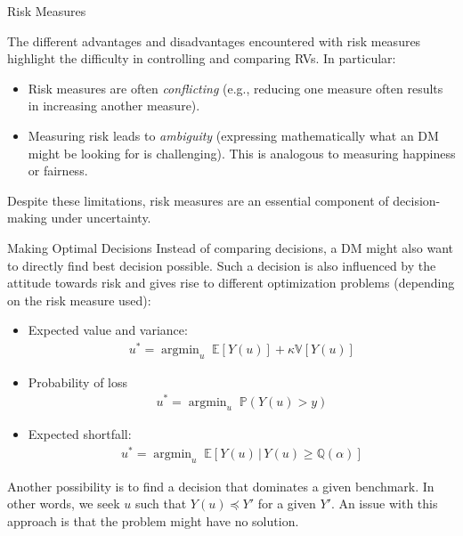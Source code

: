 \documentclass[9pt]{beamer}
\begin{document}
%
\begin{frame}{Risk Measures}

The different advantages and disadvantages encountered with risk measures highlight the difficulty in controlling and comparing RVs. In particular:

\begin{itemize}
\item Risk measures are often {\em conflicting} (e.g., reducing one measure often results in increasing another measure). 
\item Measuring risk leads to {\em ambiguity} (expressing mathematically what an DM might be looking for is challenging). This is analogous to measuring happiness or fairness. 
\end{itemize}
Despite these limitations, risk measures are an essential component of decision-making under uncertainty.

\end{frame}



%
\begin{frame}{Making Optimal Decisions}
Instead of comparing decisions, a DM might also want to directly find best decision possible. Such a decision is also influenced by the attitude towards risk and gives rise to different optimization problems (depending on the risk measure used):
\begin{block}{}
\begin{itemize}
\item Expected value and variance:
\begin{align*}
u^*=\mathop{\textrm{argmin}}_u\; \mathbb{E}[Y(u)]+ \kappa \mathbb{V}[Y(u)]
\end{align*}
\item Probability of loss
\begin{align*}
u^*=\mathop{\textrm{argmin}}_u\; \mathbb{P}(Y(u)>y)
\end{align*}
\item Expected shortfall: 
\begin{align*}
u^*=\mathop{\textrm{argmin}}_u\; \mathbb{E}[Y(u)\,|\,Y(u)\geq \mathbb{Q}(\alpha)]
\end{align*}
\end{itemize}
\end{block}
Another possibility is to find a decision that dominates a given benchmark. In other words, we seek $u$ such that $Y(u)\preceq Y'$ for a given $Y'$.  An issue with this approach is that the problem might have no solution. 
\end{frame}
\end{document}
